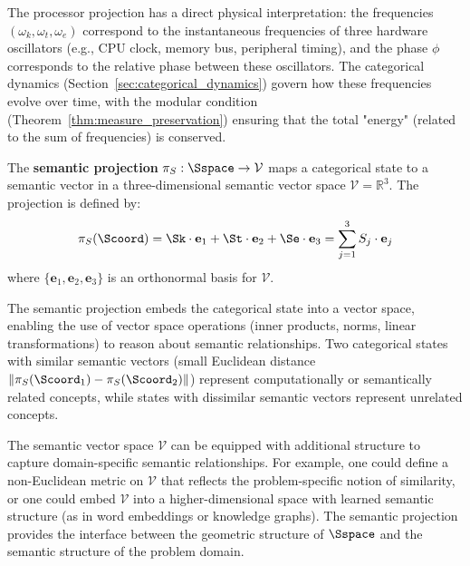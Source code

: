 \begin{remark}
\label{rem:processor_physical}
The processor projection has a direct physical interpretation: the frequencies $(\omega_k, \omega_t, \omega_e)$ correspond to the instantaneous frequencies of three hardware oscillators (e.g., CPU clock, memory bus, peripheral timing), and the phase $\phi$ corresponds to the relative phase between these oscillators. The categorical dynamics (Section~\ref{sec:categorical_dynamics}) govern how these frequencies evolve over time, with the modular condition (Theorem~\ref{thm:measure_preservation}) ensuring that the total "energy" (related to the sum of frequencies) is conserved.
\end{remark}

\begin{definition}
\label{def:semantic_projection}
The \textbf{semantic projection} $\pi_S: \Sspace \to \mathcal{V}$ maps a categorical state to a semantic vector in a three-dimensional semantic vector space $\mathcal{V} = \mathbb{R}^3$. The projection is defined by:
\begin{equation}
\pi_S(\Scoord) = \Sk \cdot \mathbf{e}_1 + \St \cdot \mathbf{e}_2 + \Se \cdot \mathbf{e}_3 = \sum_{j=1}^{3} S_j \cdot \mathbf{e}_j
\label{eq:semantic_projection}
\end{equation}
where $\{\mathbf{e}_1, \mathbf{e}_2, \mathbf{e}_3\}$ is an orthonormal basis for $\mathcal{V}$.
\end{definition}

The semantic projection embeds the categorical state into a vector space, enabling the use of vector space operations (inner products, norms, linear transformations) to reason about semantic relationships. Two categorical states with similar semantic vectors (small Euclidean distance $\|\pi_S(\Scoord_1) - \pi_S(\Scoord_2)\|$) represent computationally or semantically related concepts, while states with dissimilar semantic vectors represent unrelated concepts.



\begin{remark}
\label{rem:semantic_structure}
The semantic vector space $\mathcal{V}$ can be equipped with additional structure to capture domain-specific semantic relationships. For example, one could define a non-Euclidean metric on $\mathcal{V}$ that reflects the problem-specific notion of similarity, or one could embed $\mathcal{V}$ into a higher-dimensional space with learned semantic structure (as in word embeddings or knowledge graphs). The semantic projection provides the interface between the geometric structure of $\Sspace$ and the semantic structure of the problem domain.
\end{remark}

